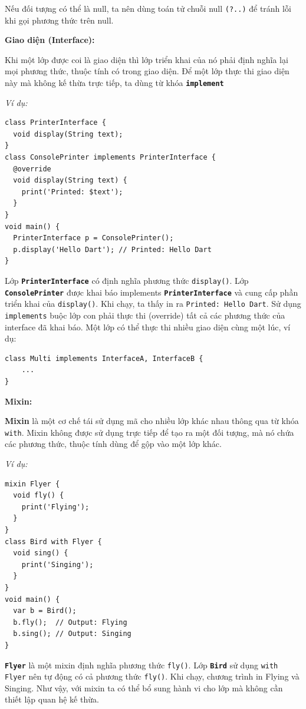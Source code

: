 \documentclass[../DoAn.tex]{subfiles}
\numberwithin{figure}{chapter}
\begin{document}
Nếu đối tượng có thể là null, ta nên dùng toán tử chuỗi null \texttt{(?..)} để tránh lỗi khi gọi phương thức trên null.

\textbf{Giao diện (Interface):} 

Khi một lớp được coi là giao diện thì lớp triển khai của nó phải định nghĩa lại mọi phương thức, thuộc tính có trong giao diện. Để một lớp thực thi giao diện này mà không kế thừa trực tiếp, ta dùng từ khóa 
\textbf{\texttt{implement}} 

\textit{Ví dụ:}
\begin{lstlisting}
class PrinterInterface {
  void display(String text);
}
class ConsolePrinter implements PrinterInterface {
  @override
  void display(String text) {
    print('Printed: $text');
  }
}
void main() {
  PrinterInterface p = ConsolePrinter();
  p.display('Hello Dart'); // Printed: Hello Dart
}
\end{lstlisting}

Lớp \textbf{\texttt{PrinterInterface}} có định nghĩa phương thức \texttt{display()}. Lớp \textbf{\texttt{ConsolePrinter}} được khai báo implements \textbf{\texttt{PrinterInterface}} và cung cấp phần triển khai của \texttt{display()}. Khi chạy, ta thấy in ra \texttt{Printed: Hello Dart}. Sử dụng \texttt{implements} buộc lớp con phải thực thi (override) tất cả các phương thức của interface đã khai báo.
Một lớp có thể thực thi nhiều giao diện cùng một lúc, ví dụ:
\begin{lstlisting}
class Multi implements InterfaceA, InterfaceB {
    ...
}
\end{lstlisting}

\textbf{Mixin:} 

\textbf{Mixin} là một cơ chế tái sử dụng mã cho nhiều lớp khác nhau thông qua từ khóa \texttt{with}. Mixin không được sử dụng trực tiếp để tạo ra một đối tượng, mà nó chứa các phương thức, thuộc tính dùng để gộp vào một lớp khác. 

\textit{Ví dụ:}
\begin{lstlisting}
mixin Flyer {
  void fly() {
    print('Flying');
  }
}
class Bird with Flyer {
  void sing() {
    print('Singing');
  }
}
void main() {
  var b = Bird();
  b.fly();  // Output: Flying
  b.sing(); // Output: Singing
}
\end{lstlisting}

\textbf{\texttt{Flyer}} là một mixin định nghĩa phương thức \texttt{fly()}. Lớp \textbf{\texttt{Bird}} sử dụng \texttt{with Flyer} nên tự động có cả phương thức \texttt{fly()}. Khi chạy, chương trình in Flying và Singing. Như vậy, với mixin ta có thể bổ sung hành vi cho lớp mà không cần thiết lập quan hệ kế thừa.
\end{document}
